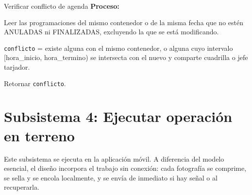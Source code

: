\begin{modspec}{Verificar conflicto de agenda}
\textbf{Proceso:}
\begin{logica}
    \item Leer las programaciones del mismo contenedor o de la misma fecha que no estén
    ANULADAS ni FINALIZADAS, excluyendo la que se está modificando.
    \item \texttt{conflicto} = existe alguna con el mismo contenedor, o alguna cuyo intervalo
    [hora\_inicio, hora\_termino) se intersecta con el nuevo y comparte cuadrilla o jefe
    tarjador.
    \item Retornar \texttt{conflicto}.
\end{logica}
\end{modspec}

\section{Subsistema 4: Ejecutar operación en terreno}

Este subsistema se ejecuta en la aplicación móvil. A diferencia del modelo esencial, el
diseño incorpora el trabajo sin conexión: cada fotografía se comprime, se sella y se encola
localmente, y se envía de inmediato si hay señal o al recuperarla.

